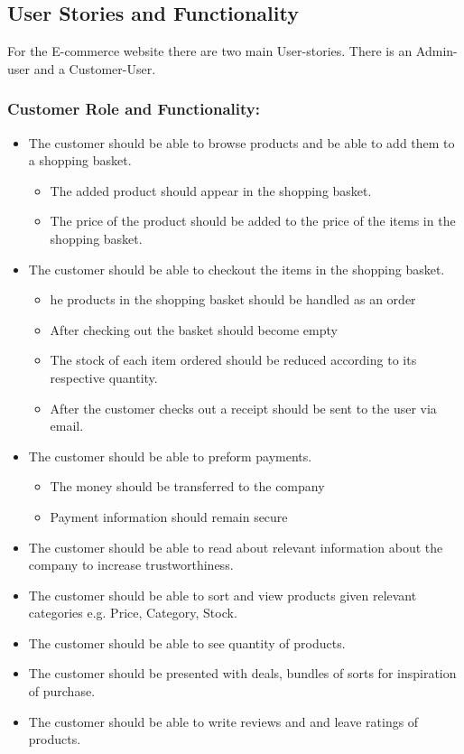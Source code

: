 \subsection{User Stories and Functionality}

For the E-commerce website there are two main User-stories. There is an
Admin-user and a Customer-User.

\subsubsection{Customer Role and Functionality:}

\begin{itemize}
    \item The customer should be able to browse products and be able to add
    them to a shopping basket.
    \begin{itemize}
        \item The added product should appear in the shopping basket.
        \item The price of the product should be added to the price of the
        items in the shopping basket.
    \end{itemize}
\item The customer should be able to checkout the items in the shopping basket.
    \begin{itemize}
        \item he products in the shopping basket should be handled as an order
        \item After checking out the basket should become empty
        \item The stock of each item ordered should be reduced according to
        its respective quantity.
        \item After the customer checks out a receipt should be sent to the
        user via email.
    \end{itemize}
\item The customer should be able to preform payments.
    \begin{itemize}
        \item The money should be transferred to the company
        \item Payment information should remain secure
    \end{itemize}
    \item The customer should be able to read about relevant information
    about the company to increase trustworthiness.
    \item The customer should be able to sort and view  products given
    relevant categories e.g. Price, Category, Stock.
    \item The customer should be able to see quantity of products. 
    \item The customer should be presented with deals, bundles of sorts for
    inspiration of purchase.
    \item The customer should be able to write reviews and and leave ratings
    of products.
\end{itemize}

